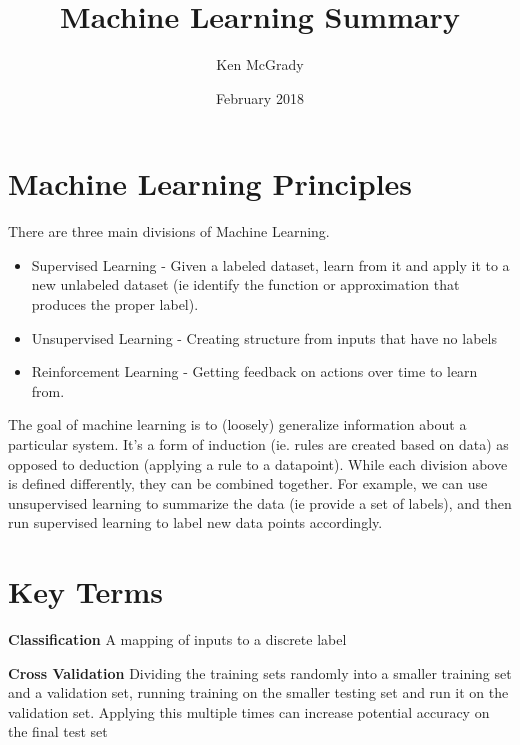 \documentclass[titlepage,11pt]{article}
\title{Machine Learning Summary}
\date{February 2018}
\author{Ken McGrady}
\begin{document}
\maketitle
\tableofcontents

\clearpage

\section{Machine Learning Principles}

There are three main divisions of Machine Learning.

\begin{itemize}
\item Supervised Learning - Given a labeled dataset, learn from it and apply it to a new unlabeled dataset (ie identify the function or approximation that produces the proper label).
\item Unsupervised Learning - Creating structure from inputs that have no labels
\item Reinforcement Learning - Getting feedback on actions over time to learn from.
\end{itemize}

The goal of machine learning is to (loosely) generalize information about a particular system. It's a form of induction (ie. rules are created based on data) as opposed to deduction (applying a rule to a datapoint). While each division above is defined differently, they can be combined together. For example, we can use unsupervised learning to summarize the data (ie provide a set of labels), and then run supervised learning to label new data points accordingly.

\section{Key Terms}

\par\noindent\hangindent=1cm \textbf{Classification} A mapping of inputs to a discrete label\\

\par\noindent\hangindent=1cm \textbf{Cross Validation} Dividing the training sets randomly into a smaller training set and a validation set, running training on the smaller testing set and run it on the validation set. Applying this multiple times can increase potential accuracy on the final test set\\
\end{document}
